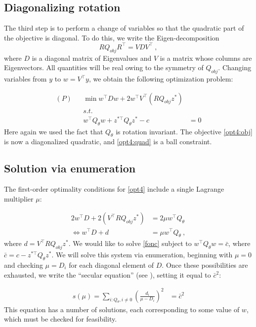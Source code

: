 \documentclass[conference]{IEEEtran}
\begin{document}
\subsection{Diagonalizing rotation}

The third step is to perform a change of variables so that the quadratic part of the objective is diagonal. To do this, we write the Eigen-decomposition $$RQ_{obj}R^\top = VDV^\top~,$$ where $D$ is a diagonal matrix of Eigenvalues and $V$ is a matrix whose columns are Eigenvectors. All quantities will be real owing to the symmetry of $Q_{obj}$. Changing variables from $y$ to $w=V^\top y$, we obtain the following optimization problem:

\begin{subequations}\label{opt4}
\begin{align}
\label{opt4:obj} (P)& & \min w^\top D w + 2w^\top V^\top (RQ_{obj}z^*) &\\
\nonumber && s.t.&\\
\label{opt4:quad} && w^\top Q_{\theta} w + z^{*\top}Q_\theta z^* - c &= 0
\end{align}
\end{subequations}
Here again we used the fact that $Q_\theta$ is rotation invariant. The objective \eqref{opt4:obj} is now a diagonalized quadratic, and \eqref{opt4:quad} is a ball constraint.

\subsection{Solution via enumeration}
 
The first-order optimality conditions for \eqref{opt4} include a single Lagrange multiplier $\mu$:

\begin{align}\label{fonc}
2w^\top D + 2(V^\top R Q_{obj}z^*) &= 2\mu w^\top Q_\theta \\
\iff w^\top D + d &= \mu w^\top Q_\theta~,
\end{align}
where $d = V^\top R Q_{obj}z^*$. We would like to solve \eqref{fonc} subject to $w^\top Q_\theta w = \bar{c}$, where $\bar{c} = c -  z^{*\top}Q_\theta z^*$. We will solve this system via enumeration, beginning with $\mu=0$ and checking $\mu=D_i$ for each diagonal element of $D$. Once these possibilities are exhausted, we write the ``secular equation'' (see \cite{bienstock2014}), setting it equal to $\bar{c}^2$:

\begin{align}\label{secular}
s(\mu) = \sum_{i:Q{_\theta,i}\neq 0} \left(\frac{d_i}{\mu - D_i}\right)^2 &= \bar{c}^2
\end{align}
This equation has a number of solutions, each corresponding to some value of $w$, which must be checked for feasibility.
\end{document}
